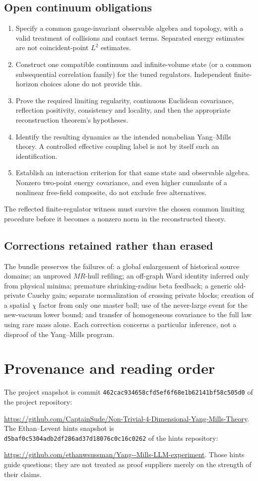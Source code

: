 \documentclass[11pt]{article}
\theoremstyle{definition}\newtheorem{definition}[theorem]{Definition}
\theoremstyle{remark}\newtheorem{remark}[theorem]{Remark}
\begin{document}
\subsection{Open continuum obligations}
\begin{enumerate}
\item Specify a common gauge-invariant observable algebra and topology, with a valid treatment of collisions and contact terms. Separated energy estimates are not coincident-point $L^2$ estimates.
\item Construct one compatible continuum and infinite-volume state (or a common subsequential correlation family) for the tuned regulators. Independent finite-horizon choices alone do not provide this.
\item Prove the required limiting regularity, continuous Euclidean covariance, reflection positivity, consistency and locality, and then the appropriate reconstruction theorem's hypotheses.
\item Identify the resulting dynamics as the intended nonabelian Yang--Mills theory. A controlled effective coupling label is not by itself such an identification.
\item Establish an interaction criterion for that same state and observable algebra. Nonzero two-point energy covariance, and even higher cumulants of a nonlinear free-field composite, do not exclude free alternatives.
\end{enumerate}
The reflected finite-regulator witness must survive the chosen common limiting procedure before it becomes a nonzero norm in the reconstructed theory.

\subsection{Corrections retained rather than erased}
The bundle preserves the failures of: a global enlargement of historical source domains; an unproved $MR$-hull refiling; an off-graph Ward identity inferred only from physical minima; premature shrinking-radius beta feedback; a generic old-private Cauchy gain; separate normalization of crossing private blocks; creation of a spatial $\chi$ factor from only one master ball; use of the never-large event for the new-vacuum lower bound; and transfer of homogeneous covariance to the full law using rare mass alone. Each correction concerns a particular inference, not a disproof of the Yang--Mills program.

\section{Provenance and reading order}
The project snapshot is commit \texttt{462cac934658cfd5ef6f68e1b62141bf58c505d0} of the project repository:\par \url{https://github.com/CaptainSude/Non-Trivial-4-Dimensional-Yang-Mills-Theory}. The Ethan--Levent hints snapshot is \texttt{d5baf0c5304adb2df286ad37d18076c0c16c0262} of the hints repository:\par \url{https://github.com/ethanwsussman/Yang--Mills-LLM-experiment}. Those hints guide questions; they are not treated as proof suppliers merely on the strength of their claims.
\end{document}
